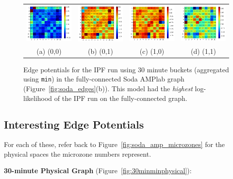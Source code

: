 \begin{figure}[!ht]
\centering
\begin{tabular}{cccc}
\includegraphics[width=1.3in]{figs/30minmin00fullconf} & \includegraphics[width=1.3in]{figs/30minmin01fullconf} & \includegraphics[width=1.3in]{figs/30minmin10fullconf} & \includegraphics[width=1.3in]{figs/30minmin11fullconf} \\
(a) (0,0) & (b) (0,1) & (c) (1,0) & (d) (1,1) \\[6pt]
\end{tabular}
\caption{Edge potentials for the IPF run using 30 minute buckets (aggregated using \texttt{min}) in the fully-connected Soda AMPlab graph (Figure~\ref{fig:soda_edges}(b)). This model had the \emph{highest} log-likelihood of the IPF run on the fully-connected graph.}
\label{fig:30minminfull}
\end{figure}


\subsection{Interesting Edge Potentials}

For each of these, refer back to Figure~\ref{fig:soda_amp_microzones} for the physical spaces the microzone numbers represent.

\textbf{30-minute Physical Graph} (Figure~\ref{fig:30minminphysical}):

